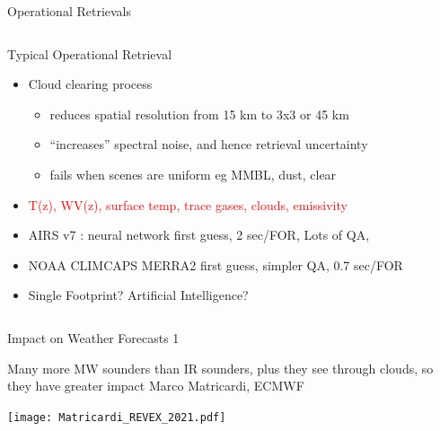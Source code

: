 \documentclass[10pt,t]{beamer}
\begin{document}
\begin{frame}[shrink=2]{Operational Retrievals}
\begin{columns}
\begin{column}{0.55\columnwidth}
\begin{block}{Typical Operational Retrieval}
  \begin{itemize}
    \item Cloud clearing process 
       \begin{itemize}
          \item reduces spatial resolution from 15 km to 3x3 or 45 km
          \item ``increases'' spectral noise, and hence retrieval uncertainty
          \item fails when scenes are uniform eg MMBL, dust, clear
       \end{itemize}
    \item \textcolor{red}{T(z), WV(z), surface temp, trace gases, clouds, emissivity}
    \item AIRS v7 : neural network first guess, 2 sec/FOR, Lots of QA, 
    \item NOAA CLIMCAPS MERRA2 first guess, simpler QA, 0.7 sec/FOR
    \item Single Footprint? Artificial Intelligence?
  \end{itemize}
\end{block}
\end{column}
\end{columns}
\end{frame}


\begin{frame}{Impact on Weather Forecasts 1}
\begin{block}{}
Many more MW sounders than IR sounders, plus they see through clouds, so they have greater impact
{\small  Marco Matricardi, ECMWF}
\vspace{-0.4in}
\begin{center}
%
\texttt{[image: Matricardi\_REVEX\_2021.pdf]}
\end{center}
\end{block}
\end{frame}
\end{document}
